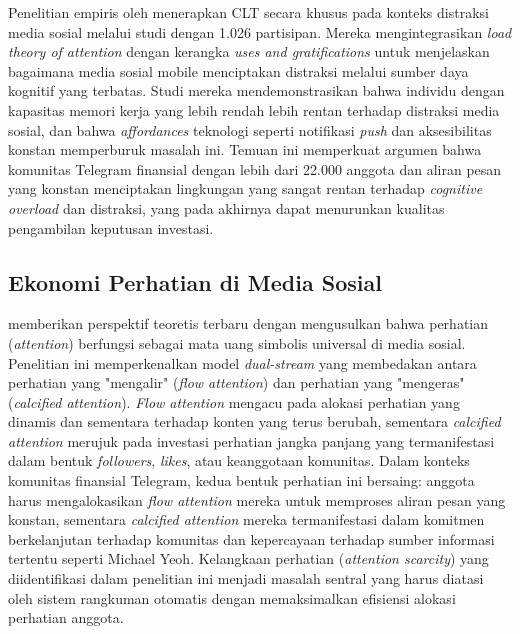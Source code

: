 Penelitian empiris oleh \textcite{sidnammauch2024} menerapkan CLT secara khusus pada konteks distraksi media sosial melalui studi dengan 1.026 partisipan. Mereka mengintegrasikan \textit{load theory of attention} dengan kerangka \textit{uses and gratifications} untuk menjelaskan bagaimana media sosial mobile menciptakan distraksi melalui sumber daya kognitif yang terbatas. Studi mereka mendemonstrasikan bahwa individu dengan kapasitas memori kerja yang lebih rendah lebih rentan terhadap distraksi media sosial, dan bahwa \textit{affordances} teknologi seperti notifikasi \textit{push} dan aksesibilitas konstan memperburuk masalah ini. Temuan ini memperkuat argumen bahwa komunitas Telegram finansial dengan lebih dari 22.000 anggota dan aliran pesan yang konstan menciptakan lingkungan yang sangat rentan terhadap \textit{cognitive overload} dan distraksi, yang pada akhirnya dapat menurunkan kualitas pengambilan keputusan investasi.

\subsection{Ekonomi Perhatian di Media Sosial}

\textcite{heitmayer2025} memberikan perspektif teoretis terbaru dengan mengusulkan bahwa perhatian (\textit{attention}) berfungsi sebagai mata uang simbolis universal di media sosial. Penelitian ini memperkenalkan model \textit{dual-stream} yang membedakan antara perhatian yang "mengalir" (\textit{flow attention}) dan perhatian yang "mengeras" (\textit{calcified attention}). \textit{Flow attention} mengacu pada alokasi perhatian yang dinamis dan sementara terhadap konten yang terus berubah, sementara \textit{calcified attention} merujuk pada investasi perhatian jangka panjang yang termanifestasi dalam bentuk \textit{followers}, \textit{likes}, atau keanggotaan komunitas. Dalam konteks komunitas finansial Telegram, kedua bentuk perhatian ini bersaing: anggota harus mengalokasikan \textit{flow attention} mereka untuk memproses aliran pesan yang konstan, sementara \textit{calcified attention} mereka termanifestasi dalam komitmen berkelanjutan terhadap komunitas dan kepercayaan terhadap sumber informasi tertentu seperti Michael Yeoh. Kelangkaan perhatian (\textit{attention scarcity}) yang diidentifikasi dalam penelitian ini menjadi masalah sentral yang harus diatasi oleh sistem rangkuman otomatis dengan memaksimalkan efisiensi alokasi perhatian anggota.


